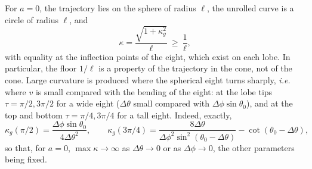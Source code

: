 For \(a=0\), the trajectory lies on the sphere of radius \(\ell\), the unrolled curve is a circle of radius \(\ell\), and
\begin{equation}
    \kappa = \frac{\sqrt{1+\kappa_g^2}}{\ell} \ \ge\ \frac1\ell,
\end{equation}
with equality at the inflection points of the eight, which exist on each lobe.
In particular, the floor \(1/\ell\) is a property of the trajectory in the cone, not of the cone.
Large curvature is produced where the spherical eight turns sharply, \emph{i.e.} where \(v\) is small compared with the bending of the eight: at the lobe tips \(\tau=\pi/2,3\pi/2\) for a wide eight (\(\Delta\theta\) small compared with \(\Delta\phi\sin\theta_0\)), and at the top and bottom \(\tau=\pi/4,3\pi/4\) for a tall eight.
Indeed, exactly,
\begin{equation}
    \kappa_g(\pi/2) = \frac{\Delta\phi\sin\theta_0}{4\Delta\theta^2}, \qquad
    \kappa_g(3\pi/4) = \frac{8\Delta\theta}{\Delta\phi^2\sin^2(\theta_0-\Delta\theta)} - \cot(\theta_0-\Delta\theta),
\end{equation}
so that, for \(a=0\), \(\max\kappa\to\infty\) as \(\Delta\theta\to0\) or as \(\Delta\phi\to0\), the other parameters being fixed.

